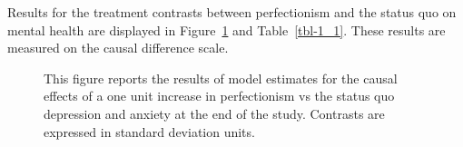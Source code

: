 \documentclass[
  single column]{article}
\begin{document}
Results for the treatment contrasts between perfectionism and the status
quo on mental health are displayed in Figure~\ref{fig-1_1} and
Table~\ref{tbl-1_1}. These results are measured on the causal difference
scale.

\begin{figure}


\caption{\label{fig-1_1}This figure reports the results of model
estimates for the causal effects of a one unit increase in perfectionism
vs the status quo depression and anxiety at the end of the study.
Contrasts are expressed in standard deviation units.}

\end{figure}%
\end{document}
